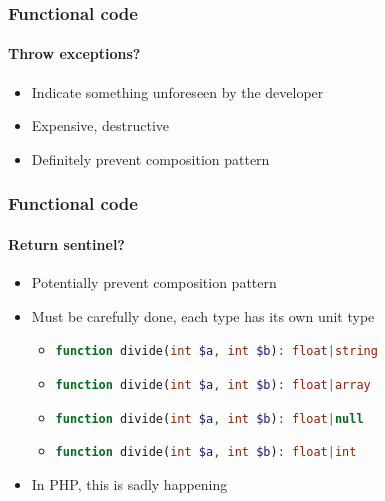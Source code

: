 \begin{frame}
  \frametitle{Functional code}
  \framesubtitle{Throw exceptions?}

  \begin{itemize}[<+->]
    \item Indicate something unforeseen by the developer
    \item Expensive, destructive
    \item Definitely prevent composition pattern
  \end{itemize}

\end{frame}

\begin{frame}
  \frametitle{Functional code}
  \framesubtitle{Return sentinel?}

  \begin{itemize}[<+->]
    \item Potentially prevent composition pattern
    \item Must be carefully done, each type has its own unit type
          \begin{itemize}[<+->]
            \item \lstinline[language=PHP]!function divide(int $a, int $b): float|string!
            \item \lstinline[language=PHP]!function divide(int $a, int $b): float|array!
            \item \lstinline[language=PHP]!function divide(int $a, int $b): float|null!
            \item \lstinline[language=PHP]!function divide(int $a, int $b): float|int!
          \end{itemize}
    \item In PHP, this is sadly happening
  \end{itemize}

\end{frame}

